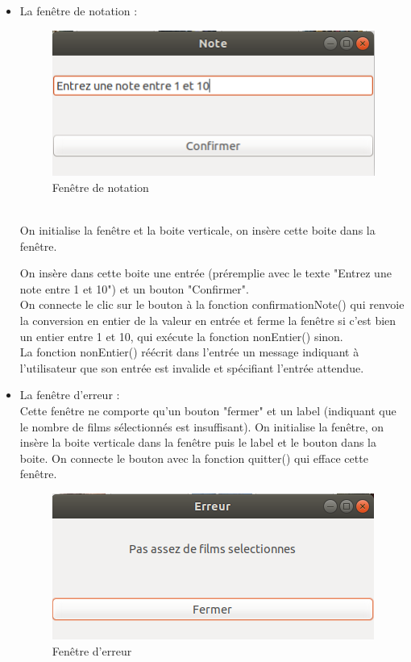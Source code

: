 \documentclass{article}
\begin{document}
\begin{itemize}
    \item La fenêtre de notation :
    \begin{figure}[h]
        \centering
        \includegraphics[scale=0.8]{InterfaceNote.png}
        \caption{Fenêtre de notation}
    \label{SMART}
    \end{figure}
    \\ On initialise la fenêtre et la boite verticale, on insère cette boite dans la fenêtre.
    
     On insère dans cette boite une entrée (préremplie avec le texte "Entrez une note entre 1 et 10") et un bouton "Confirmer".\\
    
    On connecte le clic sur le bouton à la fonction confirmationNote() qui renvoie la conversion en entier de la valeur en entrée et ferme la fenêtre si c'est bien un entier entre 1 et 10, qui exécute la fonction nonEntier() sinon.\\
    
    La fonction nonEntier() réécrit dans l'entrée un message indiquant à l'utilisateur que son entrée est invalide et spécifiant l'entrée attendue.\\
    
    \item La fenêtre d'erreur :
    \\ Cette fenêtre ne comporte qu'un bouton "fermer" et un label (indiquant que le nombre de films sélectionnés est insuffisant). On initialise la fenêtre, on insère la boite verticale dans la fenêtre puis le label et le bouton dans la boite. On connecte le bouton avec la fonction quitter() qui efface cette fenêtre.
    
    \begin{figure}[h]
        \centering
        \includegraphics[scale=0.8]{InterfaceErreur.png}
        \caption{Fenêtre d'erreur}
    \label{SMART}
    \end{figure}
\end{itemize}
\end{document}
